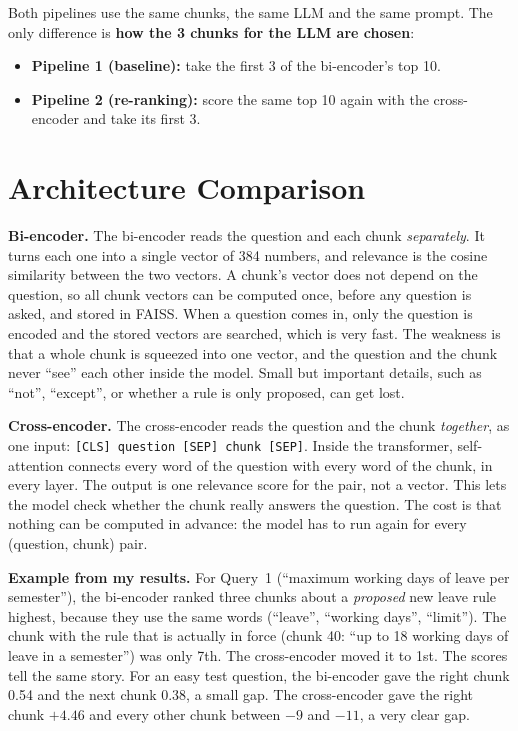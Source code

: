 \documentclass[11pt,a4paper]{article}
\begin{document}
Both pipelines use the same chunks, the same LLM and the same prompt. The only difference is \textbf{how the 3 chunks for the LLM are chosen}:
\begin{itemize}
  \item \textbf{Pipeline 1 (baseline):} take the first 3 of the bi-encoder's top 10.
  \item \textbf{Pipeline 2 (re-ranking):} score the same top 10 again with the cross-encoder and take its first 3.
\end{itemize}

\section{Architecture Comparison}

\textbf{Bi-encoder.} The bi-encoder reads the question and each chunk \emph{separately}. It turns each one into a single vector of 384 numbers, and relevance is the cosine similarity between the two vectors. A chunk's vector does not depend on the question, so all chunk vectors can be computed once, before any question is asked, and stored in FAISS. When a question comes in, only the question is encoded and the stored vectors are searched, which is very fast. The weakness is that a whole chunk is squeezed into one vector, and the question and the chunk never ``see'' each other inside the model. Small but important details, such as ``not'', ``except'', or whether a rule is only proposed, can get lost.

\textbf{Cross-encoder.} The cross-encoder reads the question and the chunk \emph{together}, as one input: \texttt{[CLS] question [SEP] chunk [SEP]}. Inside the transformer, self-attention connects every word of the question with every word of the chunk, in every layer. The output is one relevance score for the pair, not a vector. This lets the model check whether the chunk really answers the question. The cost is that nothing can be computed in advance: the model has to run again for every (question, chunk) pair.

\textbf{Example from my results.} For Query~1 (``maximum working days of leave per semester''), the bi-encoder ranked three chunks about a \emph{proposed} new leave rule highest, because they use the same words (``leave'', ``working days'', ``limit''). The chunk with the rule that is actually in force (chunk 40: ``up to 18 working days of leave in a semester'') was only 7th. The cross-encoder moved it to 1st. The scores tell the same story. For an easy test question, the bi-encoder gave the right chunk 0.54 and the next chunk 0.38, a small gap. The cross-encoder gave the right chunk $+4.46$ and every other chunk between $-9$ and $-11$, a very clear gap.
\end{document}

